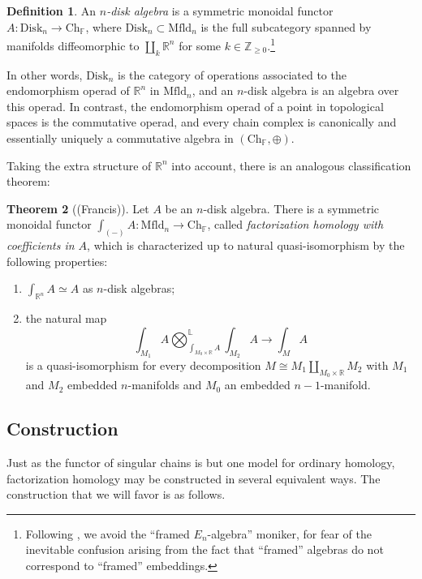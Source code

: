 \documentclass{compositio}
\theoremstyle{definition}\newtheorem{definition}{Definition}[section]
\theoremstyle{theorem}\newtheorem{lemma}[definition]{Lemma}
\theoremstyle{remark}\newtheorem*{conventions}{Conventions}
\theoremstyle{remark}\newtheorem*{acknowledgments}{Acknowledgments}
\theoremstyle{remark}\newtheorem*{outline}{Outline}
\theoremstyle{remark}\newtheorem*{questions}{Questions}
\theoremstyle{remark}\newtheorem{example}[definition]{Example}
\theoremstyle{definition}\newtheorem{construction}[definition]{Construction}
\theoremstyle{definition}\newtheorem*{convention}{Convention}
\theoremstyle{definition}\newtheorem*{conjecture}{Conjecture}
\theoremstyle{theorem}\newtheorem{theorem}[definition]{Theorem}
\theoremstyle{theorem}\newtheorem{paradigm}[definition]{Paradigm}
\theoremstyle{remark}\newtheorem{remark}[definition]{Remark}
\theoremstyle{corollary}\newtheorem{corollary}[definition]{Corollary}
\theoremstyle{theorem}\newtheorem{proposition}[definition]{Proposition}
\theoremstyle{definition}\newtheorem{question}[definition]{Question}
\begin{document}
\begin{definition}
An \emph{$n$-disk algebra} is a symmetric monoidal functor $A:{\mathrm{Disk}}_n\to {\mathrm{Ch}}_\mathbb{F}$, where ${\mathrm{Disk}}_n\subset {\mathrm{Mfld}}_n$ is the full subcategory spanned by manifolds diffeomorphic to $\amalg_k\mathbb{R}^n$ for some $k\in\mathbb{Z}_{\geq0}$.\footnote{Following \cite{Francis}, we avoid the ``framed $E_n$-algebra'' moniker, for fear of the inevitable confusion arising from the fact that ``framed'' algebras do not correspond to ``framed'' embeddings.}
\end{definition}

In other words, ${\mathrm{Disk}}_n$ is the category of operations associated to the endomorphism operad of $\mathbb{R}^n$ in ${\mathrm{Mfld}}_n$, and an $n$-disk algebra is an algebra over this operad. In contrast, the endomorphism operad of a point in topological spaces is the commutative operad, and every chain complex is canonically and essentially uniquely a commutative algebra in $({\mathrm{Ch}}_\mathbb{F},\oplus)$.

Taking the extra structure of $\mathbb{R}^n$ into account, there is an analogous classification theorem:

\begin{theorem}[(Francis)]
Let $A$ be an $n$-disk algebra. There is a symmetric monoidal functor $\int_{(-)}A:{\mathrm{Mfld}}_n\to {\mathrm{Ch}}_\mathbb{F}$, called \emph{factorization homology with coefficients in $A$}, which is characterized up to natural quasi-isomorphism by the following properties:
\begin{enumerate}
\item $\int_{\mathbb{R}^n}A\simeq A$ as $n$-disk algebras;
\item the natural map $$\int_{M_1}A\bigotimes^\mathbb{L}_{\int_{M_0\times\mathbb{R}}A}\int_{M_2}A\to \int_MA$$ is a quasi-isomorphism for every decomposition $M\cong M_1\amalg_{M_0\times\mathbb{R}}M_2$ with $M_1$ and $M_2$ embedded $n$-manifolds and $M_0$ an embedded $n-1$-manifold.
\end{enumerate}
\end{theorem}

\subsection{Construction}
Just as the functor of singular chains is but one model for ordinary homology, factorization homology may be constructed in several equivalent ways. The construction that we will favor is as follows.
\end{document}
